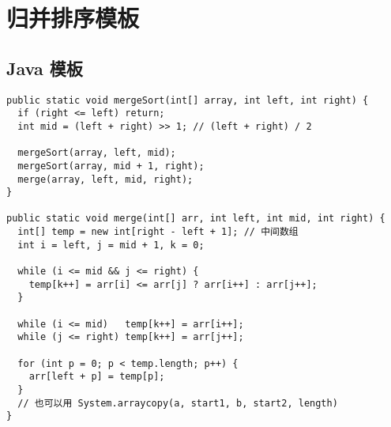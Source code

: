 \newpage
\section{归并排序模板}

\subsection{Java 模板}

\begin{verbatim}
public static void mergeSort(int[] array, int left, int right) {
  if (right <= left) return;
  int mid = (left + right) >> 1; // (left + right) / 2

  mergeSort(array, left, mid);
  mergeSort(array, mid + 1, right);
  merge(array, left, mid, right);
}

public static void merge(int[] arr, int left, int mid, int right) {
  int[] temp = new int[right - left + 1]; // 中间数组
  int i = left, j = mid + 1, k = 0;

  while (i <= mid && j <= right) {
    temp[k++] = arr[i] <= arr[j] ? arr[i++] : arr[j++];
  }

  while (i <= mid)   temp[k++] = arr[i++];
  while (j <= right) temp[k++] = arr[j++];

  for (int p = 0; p < temp.length; p++) {
    arr[left + p] = temp[p];
  }
  // 也可以用 System.arraycopy(a, start1, b, start2, length)
}
\end{verbatim}
